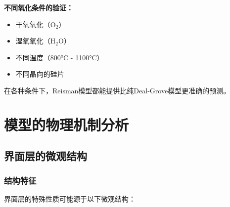 \documentclass[UTF8,12pt,a4paper]{ctexart}
\begin{document}
\textbf{不同氧化条件的验证：}
\begin{itemize}
    \item 干氧氧化（O$_2$）
    \item 湿氧氧化（H$_2$O）
    \item 不同温度（800°C - 1100°C）
    \item 不同晶向的硅片
\end{itemize}

在各种条件下，Reisman模型都能提供比纯Deal-Grove模型更准确的预测。

\newpage
\section{模型的物理机制分析}

\subsection{界面层的微观结构}

\subsubsection{结构特征}

界面层的特殊性质可能源于以下微观结构：
\end{document}
